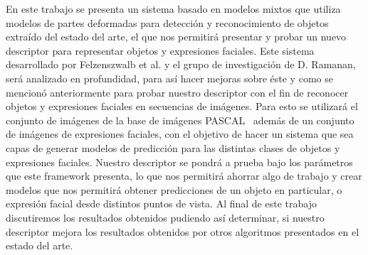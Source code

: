 \documentclass[final]{udpthesis}
\theoremstyle{definition}
\begin{document}
\begin{resumen}

En este trabajo se presenta un sistema basado en modelos mixtos que utiliza modelos de partes deformadas para detección y reconocimiento de objetos extraído del estado del arte, el que nos permitirá presentar y probar un nuevo descriptor para representar objetos y expresiones faciales. Este sistema~\cite{Felzenszwalb2008,Felzenszwalb2010,Felzenszwalb2013} desarrollado por Felzenszwalb et al. y el grupo de investigación de D. Ramanan, será analizado en profundidad, para así hacer mejoras sobre éste y como se mencionó anteriormente para probar nuestro descriptor con el fin de reconocer objetos y expresiones faciales en secuencias de imágenes. Para esto se utilizará el conjunto de imágenes de la base de imágenes PASCAL~\cite{Everingham2010} además de un conjunto de imágenes de expresiones faciales, con el objetivo de hacer un sistema que sea capas de generar modelos de predicción para las distintas clases de objetos y expresiones faciales. Nuestro descriptor se pondrá a prueba bajo los parámetros que este framework presenta, lo que nos permitirá ahorrar algo de trabajo y crear modelos que nos permitirá obtener predicciones de un objeto en particular, o expresión facial desde distintos puntos de vista. Al final de este trabajo discutiremos los resultados obtenidos pudiendo así determinar, si nuestro descriptor mejora los resultados obtenidos por otros algoritmos presentados en el estado del arte.
\end{resumen}


\mainmatter






%

\backmatter



\appendix

%
\end{document}

